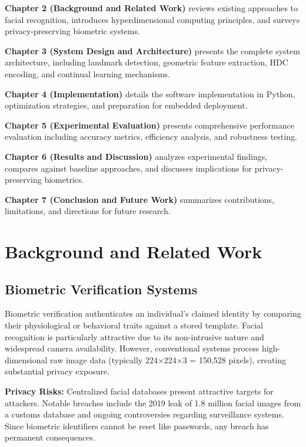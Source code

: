 \documentclass[a4paper,12pt]{article}
\begin{document}
\textbf{Chapter 2 (Background and Related Work)} reviews existing approaches to facial recognition, introduces hyperdimensional computing principles, and surveys privacy-preserving biometric systems.

\textbf{Chapter 3 (System Design and Architecture)} presents the complete system architecture, including landmark detection, geometric feature extraction, HDC encoding, and continual learning mechanisms.

\textbf{Chapter 4 (Implementation)} details the software implementation in Python, optimization strategies, and preparation for embedded deployment.

\textbf{Chapter 5 (Experimental Evaluation)} presents comprehensive performance evaluation including accuracy metrics, efficiency analysis, and robustness testing.

\textbf{Chapter 6 (Results and Discussion)} analyzes experimental findings, compares against baseline approaches, and discusses implications for privacy-preserving biometrics.

\textbf{Chapter 7 (Conclusion and Future Work)} summarizes contributions, limitations, and directions for future research.

\newpage

\section{Background and Related Work}

\subsection{Biometric Verification Systems}

Biometric verification authenticates an individual's claimed identity by comparing their physiological or behavioral traits against a stored template. Facial recognition is particularly attractive due to its non-intrusive nature and widespread camera availability. However, conventional systems process high-dimensional raw image data (typically 224×224×3 = 150,528 pixels), creating substantial privacy exposure.

\textbf{Privacy Risks:} Centralized facial databases present attractive targets for attackers. Notable breaches include the 2019 leak of 1.8 million facial images from a customs database and ongoing controversies regarding surveillance systems. Since biometric identifiers cannot be reset like passwords, any breach has permanent consequences.
\end{document}
